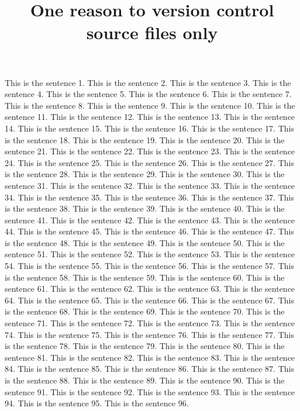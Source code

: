 \documentclass{article}
\title{One reason to version control source files only}
\begin{document}
\maketitle


This is the sentence 1.
This is the sentence 2.
This is the sentence 3.
This is the sentence 4.
This is the sentence 5.
This is the sentence 6.
This is the sentence 7.
This is the sentence 8.
This is the sentence 9.
This is the sentence 10.
This is the sentence 11.
This is the sentence 12.
This is the sentence 13.
This is the sentence 14.
This is the sentence 15.
This is the sentence 16.
This is the sentence 17.
This is the sentence 18.
This is the sentence 19.
This is the sentence 20.
This is the sentence 21.
This is the sentence 22.
This is the sentence 23.
This is the sentence 24.
This is the sentence 25.
This is the sentence 26.
This is the sentence 27.
This is the sentence 28.
This is the sentence 29.
This is the sentence 30.
This is the sentence 31.
This is the sentence 32.
This is the sentence 33.
This is the sentence 34.
This is the sentence 35.
This is the sentence 36.
This is the sentence 37.
This is the sentence 38.
This is the sentence 39.
This is the sentence 40.
This is the sentence 41.
This is the sentence 42.
This is the sentence 43.
This is the sentence 44.
This is the sentence 45.
This is the sentence 46.
This is the sentence 47.
This is the sentence 48.
This is the sentence 49.
This is the sentence 50.
This is the sentence 51.
This is the sentence 52.
This is the sentence 53.
This is the sentence 54.
This is the sentence 55.
This is the sentence 56.
This is the sentence 57.
This is the sentence 58.
This is the sentence 59.
This is the sentence 60.
This is the sentence 61.
This is the sentence 62.
This is the sentence 63.
This is the sentence 64.
This is the sentence 65.
This is the sentence 66.
This is the sentence 67.
This is the sentence 68.
This is the sentence 69.
This is the sentence 70.
This is the sentence 71.
This is the sentence 72.
This is the sentence 73.
This is the sentence 74.
This is the sentence 75.
This is the sentence 76.
This is the sentence 77.
This is the sentence 78.
This is the sentence 79.
This is the sentence 80.
This is the sentence 81.
This is the sentence 82.
This is the sentence 83.
This is the sentence 84.
This is the sentence 85.
This is the sentence 86.
This is the sentence 87.
This is the sentence 88.
This is the sentence 89.
This is the sentence 90.
This is the sentence 91.
This is the sentence 92.
This is the sentence 93.
This is the sentence 94.
This is the sentence 95.
This is the sentence 96.
\end{document}
